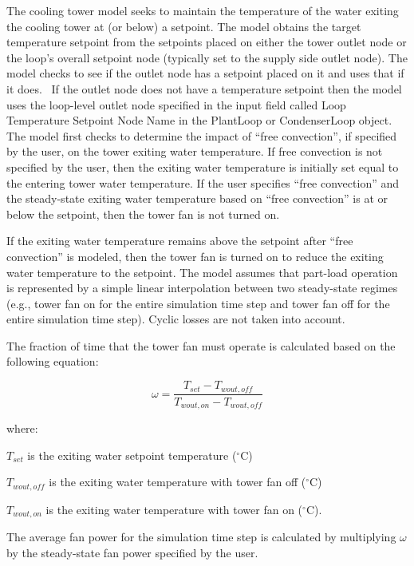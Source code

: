 The cooling tower model seeks to maintain the temperature of the water exiting the cooling tower at (or below) a setpoint. The model obtains the target temperature setpoint from the setpoints placed on either the tower outlet node or the loop's overall setpoint node (typically set to the supply side outlet node). The model checks to see if the outlet node has a setpoint placed on it and uses that if it does.~ If the outlet node does not have a temperature setpoint then the model uses the loop-level outlet node specified in the input field called Loop Temperature Setpoint Node Name in the PlantLoop or CondenserLoop object. The model first checks to determine the impact of ``free convection'', if specified by the user, on the tower exiting water temperature. If free convection is not specified by the user, then the exiting water temperature is initially set equal to the entering tower water temperature. If the user specifies ``free convection'' and the steady-state exiting water temperature based on ``free convection'' is at or below the setpoint, then the tower fan is not turned on.

If the exiting water temperature remains above the setpoint after ``free convection'' is modeled, then the tower fan is turned on to reduce the exiting water temperature to the setpoint. The model assumes that part-load operation is represented by a simple linear interpolation between two steady-state regimes (e.g., tower fan on for the entire simulation time step and tower fan off for the entire simulation time step). Cyclic losses are not taken into account.

The fraction of time that the tower fan must operate is calculated based on the following equation:

\begin{equation}
\omega = \frac{{{T_{set}} - {T_{wout,off}}}}{{{T_{wout,on}} - {T_{wout,off}}}}
\label{eq:omegafunctionvariousTs515}
\end{equation}

where:

\({T_{set}}\) is the exiting water setpoint temperature (\(^{\circ}\)C)

\({T_{wout,off}}\) is the exiting water temperature with tower fan off (\(^{\circ}\)C)

\({T_{wout,on}}\) is the exiting water temperature with tower fan on (\(^{\circ}\)C).

The average fan power for the simulation time step is calculated by multiplying \(\omega\) by the steady-state fan power specified by the user.

